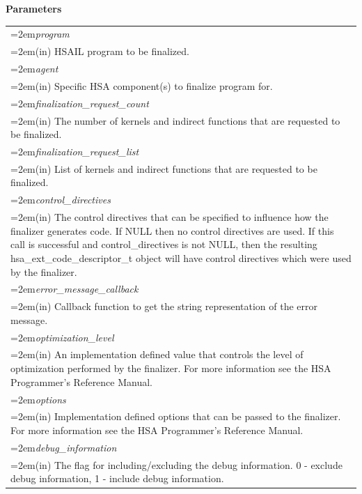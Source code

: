 \documentclass[final,oneside]{book}
\newcommand{\refarg}[1]{\textit{#1}}
\begin{document}
\noindent\textbf{Parameters}\\[-6mm]
\noindent\begin{longtable}{@{}>{\hangindent=2em}p{\textwidth}}
\refarg{program}\\\hspace{2em}(in) HSAIL program to be finalized.\\[2mm]
\refarg{agent}\\\hspace{2em}(in) Specific HSA component(s) to finalize program for.\\[2mm]
\refarg{finalization_\-request_\-count}\\\hspace{2em}(in) The number of kernels and indirect functions that are requested to be finalized.\\[2mm]
\refarg{finalization_\-request_\-list}\\\hspace{2em}(in) List of kernels and indirect functions that are requested to be finalized.\\[2mm]
\refarg{control_\-directives}\\\hspace{2em}(in) The control directives that can be specified to influence how the finalizer generates code. If NULL then no control directives are used. If this call is successful and control_\-directives is not NULL, then the resulting hsa_\-ext_\-code_\-descriptor_\-t object will have control directives which were used by the finalizer.\\[2mm]
\refarg{error_\-message_\-callback}\\\hspace{2em}(in) Callback function to get the string representation of the error message.\\[2mm]
\refarg{optimization_\-level}\\\hspace{2em}(in) An implementation defined value that controls the level of optimization performed by the finalizer. For more information see the HSA Programmer's Reference Manual.\\[2mm]
\refarg{options}\\\hspace{2em}(in) Implementation defined options that can be passed to the finalizer. For more information see the HSA Programmer's Reference Manual.\\[2mm]
\refarg{debug_\-information}\\\hspace{2em}(in) The flag for including/excluding the debug information. 0 - exclude debug information, 1 - include debug information.
\end{longtable}
\end{document}
